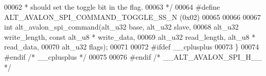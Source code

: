 \begin{DoxyCode}
00062 \textcolor{comment}{ * should set the toggle bit in the flag.}
00063 \textcolor{comment}{ */}
00064 \textcolor{preprocessor}{#define ALT\_AVALON\_SPI\_COMMAND\_TOGGLE\_SS\_N (0x02)}
00065 
00066 
00067 \textcolor{keywordtype}{int} alt_avalon_spi_command(alt_u32 base, alt_u32 slave,
00068                            alt_u32 write\_length, \textcolor{keyword}{const} alt_u8 * write\_data,
00069                            alt_u32 read\_length, alt_u8 * read\_data,
00070                            alt_u32 flags);
00071 
00072 \textcolor{preprocessor}{#ifdef \_\_cplusplus}
00073 \}
00074 \textcolor{preprocessor}{#endif }\textcolor{comment}{/* \_\_cplusplus */}\textcolor{preprocessor}{}
00075 
00076 \textcolor{preprocessor}{#endif }\textcolor{comment}{/* \_\_ALT\_AVALON\_SPI\_H\_\_ */}\textcolor{preprocessor}{}
\end{DoxyCode}
